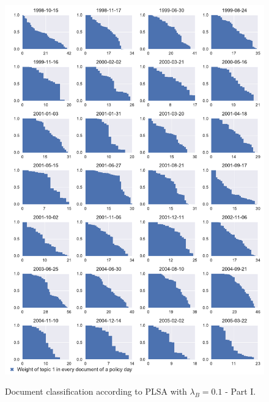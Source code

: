 \documentclass[11pt,a4paper,english,oneside]{book}
\numberwithin{equation}{chapter}
\begin{document}
\begin{figure}
	\caption{Document classification according to PLSA with $\lambda_B = 0.1$ - Part I.}
	\centering
	\includegraphics[scale=0.8]{Images/docsplit01_bgLamb_0_1.pdf}
	\label{classdoc01L01}
\end{figure}
\end{document}
